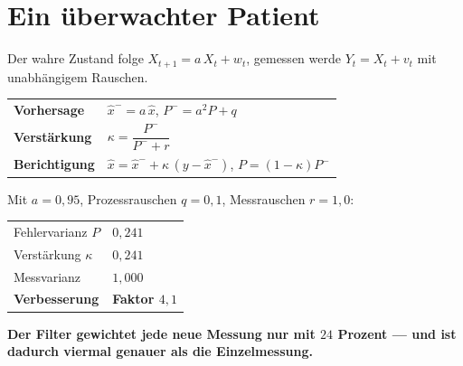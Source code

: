 \section{Ein überwachter Patient}

\begin{merksatz}
Der wahre Zustand folge $X_{t+1} = a\,X_t + w_t$, gemessen werde $Y_t = X_t + v_t$ mit unabhängigem Rauschen.

\begin{center}
{\small
\renewcommand{\arraystretch}{1.55}
\begin{tabular}{@{}P{2.4cm}P{6.2cm}@{}}
\toprule
\textbf{Vorhersage} & $\hat x^- = a\,\hat x$, \quad $P^- = a^{2}P + q$\\
\textbf{Verstärkung} & $\kappa = \dfrac{P^-}{P^- + r}$\\
\textbf{Berichtigung} & $\hat x = \hat x^- + \kappa\,(y - \hat x^-)$, \quad $P = (1-\kappa)P^-$\\
\bottomrule
\end{tabular}}
\end{center}

Mit $a = 0{,}95$, Prozessrauschen $q = 0{,}1$, Messrauschen $r = 1{,}0$:

\begin{center}
{\small
\renewcommand{\arraystretch}{1.48}
\begin{tabular}{@{}P{2.8cm}P{2.4cm}@{}}
\toprule
Fehlervarianz $P$ & $0{,}241$\\
Verstärkung $\kappa$ & $0{,}241$\\
Messvarianz & $1{,}000$\\
\midrule
\textbf{Verbesserung} & \textbf{Faktor $4{,}1$}\\
\bottomrule
\end{tabular}}
\end{center}

\begin{center}
\begin{minipage}{0.9\textwidth}
\textbf{Der Filter gewichtet jede neue Messung nur mit $24$ Prozent --- und ist dadurch viermal genauer als die Einzelmessung.}
\end{minipage}
\end{center}

\begin{center}
\begin{minipage}{0.88\textwidth}
\end{minipage}
\end{center}
\end{merksatz}

